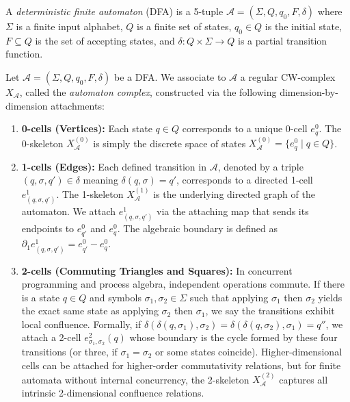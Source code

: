 \begin{definition}
A \emph{deterministic finite automaton} (DFA) is a 5-tuple $\mathcal{A} = (\Sigma, Q, q_0, F, \delta)$ where $\Sigma$ is a finite input alphabet, $Q$ is a finite set of states, $q_0 \in Q$ is the initial state, $F \subseteq Q$ is the set of accepting states, and $\delta: Q \times \Sigma \to Q$ is a partial transition function.
\end{definition}

\begin{definition}
Let $\mathcal{A} = (\Sigma, Q, q_0, F, \delta)$ be a DFA. We associate to $\mathcal{A}$ a regular CW-complex $X_\mathcal{A}$, called the \emph{automaton complex}, constructed via the following dimension-by-dimension attachments:
\begin{enumerate}
    \item \textbf{0-cells (Vertices):} Each state $q \in Q$ corresponds to a unique 0-cell $e^0_q$. The 0-skeleton $X_\mathcal{A}^{(0)}$ is simply the discrete space of states $X_\mathcal{A}^{(0)} = \{ e^0_q \mid q \in Q \}$.
    \item \textbf{1-cells (Edges):} Each defined transition in $\mathcal{A}$, denoted by a triple $(q, \sigma, q') \in \delta$ meaning $\delta(q, \sigma) = q'$, corresponds to a directed 1-cell $e^1_{(q, \sigma, q')}$. The 1-skeleton $X_\mathcal{A}^{(1)}$ is the underlying directed graph of the automaton. We attach $e^1_{(q, \sigma, q')}$ via the attaching map that sends its endpoints to $e^0_{q'}$ and $e^0_q$. The algebraic boundary is defined as $\partial_1 e^1_{(q, \sigma, q')} = e^0_{q'} - e^0_q$.
    \item \textbf{2-cells (Commuting Triangles and Squares):} In concurrent programming and process algebra, independent operations commute. If there is a state $q \in Q$ and symbols $\sigma_1, \sigma_2 \in \Sigma$ such that applying $\sigma_1$ then $\sigma_2$ yields the exact same state as applying $\sigma_2$ then $\sigma_1$, we say the transitions exhibit local confluence. Formally, if $\delta(\delta(q, \sigma_1), \sigma_2) = \delta(\delta(q, \sigma_2), \sigma_1) = q''$, we attach a 2-cell $e^2_{\sigma_1, \sigma_2}(q)$ whose boundary is the cycle formed by these four transitions (or three, if $\sigma_1 = \sigma_2$ or some states coincide). 
    Higher-dimensional cells can be attached for higher-order commutativity relations, but for finite automata without internal concurrency, the 2-skeleton $X_\mathcal{A}^{(2)}$ captures all intrinsic 2-dimensional confluence relations.
\end{enumerate}
\end{definition}

